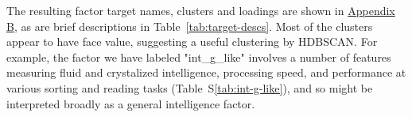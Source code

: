\documentclass{article}
\begin{document}
The resulting factor target names, clusters and loadings are shown in
\hyperref[sec:appendix-b]{Appendix B}, as are brief descriptions in
Table~\ref{tab:target-descs}. Most of the clusters appear to have face value,
suggesting a useful clustering by HDBSCAN\@. For example, the factor we have
labeled "int\_g\_like" involves a number of features measuring fluid and
crystalized intelligence, processing speed, and performance at various
sorting and reading tasks (Table~S\ref{tab:int-g-like}), and so
might be interpreted broadly as a general intelligence factor.

\end{document}
